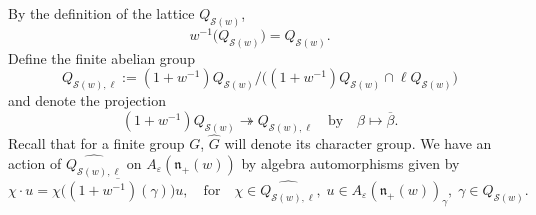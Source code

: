 \documentclass[11pt]{amsart}
\theoremstyle{plain}
\def \SS {{\mathcal{S}}}
\def \ep {\varepsilon}
\def \mt  {\mapsto}
\def \ol {\overline}
\def \wh {\widehat}
\def \n  {\mathfrak{n}}
\begin{document}
By the definition of the lattice $Q_{\SS(w)}$, 
\[
w^{-1} \big( Q_{\SS(w)} \big) = Q_{\SS(w)}. 
\]
Define the finite abelian group 
\begin{equation}
    \label{Qswl}
Q_{\SS(w),\ell}:=
(1+w^{-1})Q_{\SS(w)}/\big( (1+w^{-1})Q_{\SS(w)} \cap \ell Q_{\SS(w)} \big)
\end{equation}
and denote the projection
\[
(1+w^{-1})Q_{\SS(w)} \twoheadrightarrow Q_{\SS(w),\ell} \quad \mbox{by} \quad
\beta \mt \ol{\beta}.
\]
Recall that for a finite group $G$, $\wh{G}$ will denote its character group. We have an action of $\wh{Q_{\SS(w),\ell}}$ on $A_\ep(\n_+(w))$ by algebra automorphisms given by 
\[
\chi \cdot u = \chi \Big( \ol{(1+ w^{-1})(\gamma)} \Big) u, \quad \mbox{for} \quad 
\chi \in \wh{Q_{\SS(w),\ell}}, \; 
u \in A_\ep(\n_+(w))_\gamma, \; \gamma \in Q_{\SS(w)}. 
\]
\end{document}

